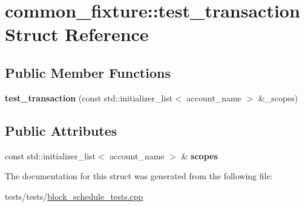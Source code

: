\hypertarget{structcommon__fixture_1_1test__transaction}{}\section{common\+\_\+fixture\+:\+:test\+\_\+transaction Struct Reference}
\label{structcommon__fixture_1_1test__transaction}
\subsection*{Public Member Functions}
\begin{DoxyCompactItemize}
\item 
\mbox{\label{structcommon__fixture_1_1test__transaction_a62bc8a539023dcc5f989ad1bccfb3c7f}} 
{\bfseries test\+\_\+transaction} (const std\+::initializer\+\_\+list$<$ account\+\_\+name $>$ \&\+\_\+scopes)
\end{DoxyCompactItemize}
\subsection*{Public Attributes}
\begin{DoxyCompactItemize}
\item 
\mbox{\label{structcommon__fixture_1_1test__transaction_a807b1498ea1edd4f6aabc84dd1887c53}} 
const std\+::initializer\+\_\+list$<$ account\+\_\+name $>$ \& {\bfseries scopes}
\end{DoxyCompactItemize}


The documentation for this struct was generated from the following file\+:\begin{DoxyCompactItemize}
\item 
tests/tests/\mbox{\hyperlink{block__schedule__tests_8cpp}{block\+\_\+schedule\+\_\+tests.\+cpp}}\end{DoxyCompactItemize}
